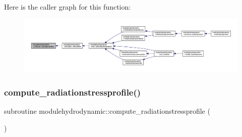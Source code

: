 Here is the caller graph for this function\+:\nopagebreak
\begin{figure}[H]
\begin{center}
\leavevmode
\includegraphics[width=350pt]{namespacemodulehydrodynamic_a6bae766b43109e13a0a6976d688327fe_icgraph}
\end{center}
\end{figure}
\mbox{\label{namespacemodulehydrodynamic_adfd6bacb2def8a8594fec898fd389d7d}} 
\subsubsection{\texorpdfstring{compute\+\_\+radiationstressprofile()}{compute\_radiationstressprofile()}}
{\footnotesize\ttfamily subroutine modulehydrodynamic\+::compute\+\_\+radiationstressprofile (\begin{DoxyParamCaption}{ }\end{DoxyParamCaption})\hspace{0.3cm}{\ttfamily [private]}}

